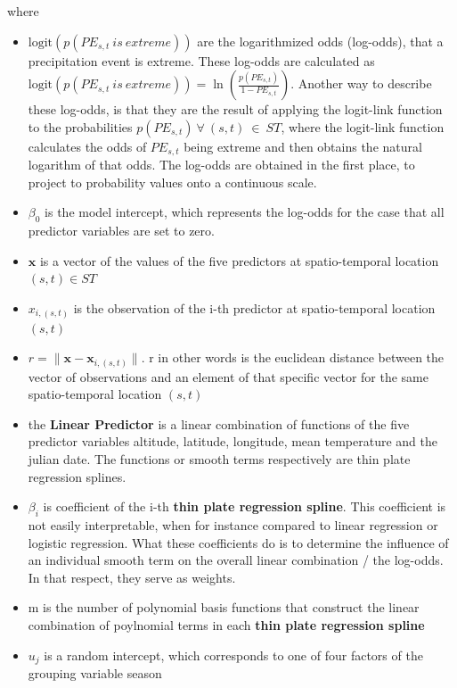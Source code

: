 \documentclass[
  12pt,
]{article}
\begin{document}
\begingroup
\justify

where

\begin{itemize}[label={\textbullet}]
\item $\text{logit}(p(PE_{s,t}\:is\:extreme))$ are the logarithmized odds (log-odds), that a precipitation event is extreme. These log-odds are calculated as $\text{logit}(p(PE_{s,t}\:is\:extreme))=\ln\left(\frac{p(PE_{s,t})}{1-PE_{s,t}}\right)$. Another way to describe these log-odds, is that they are the result of applying the logit-link function to the probabilities $p(PE_{s,t})\:\forall\:(s,t)\:\in\:ST$, where the logit-link function calculates the odds of $PE_{s,t}$ being extreme and then obtains the natural logarithm of that odds. The log-odds are obtained in the first place, to project to probability values onto a continuous scale.
\item $\beta_{0}$ is the model intercept, which represents the log-odds for the case that all predictor variables are set to zero.
    \item $\boldsymbol{x}$ is a vector of the values of the five predictors at spatio-temporal location $(s,t)\in ST$
    \item $x_{i,(s,t)}$ is the observation of the i-th predictor at spatio-temporal location $(s,t)$
    \item $r=\lVert \boldsymbol{x} - \boldsymbol{x}_{i,(s,t)} \rVert$. r in other words is the euclidean distance between the vector of observations and an element of that specific vector for the same spatio-temporal location $(s,t)$
    \item the \textbf{Linear Predictor} is a linear combination of functions of the five predictor variables altitude, latitude, longitude, mean temperature and the julian date. The functions or smooth terms respectively are thin plate regression splines. 
    \item $\beta_i$ is coefficient of the i-th \textbf{thin plate regression spline}. This coefficient is not easily interpretable, when for instance compared to linear regression or logistic regression. What these coefficients do is to determine the influence of an individual smooth term on the overall linear combination / the log-odds. In that respect, they serve as weights. 
    \item m is the number of polynomial basis functions that construct the linear combination of poylnomial terms in each \textbf{thin plate regression spline}
    \item $u_j$ is a random intercept, which corresponds to one of four factors of the grouping variable season  

\end{itemize}
\end{document}
